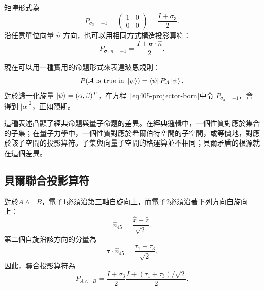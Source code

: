 矩陣形式為
\begin{equation}
  P_{\sigma_3=+1}
  =
  \begin{pmatrix}1&0\\0&0\end{pmatrix}
  =
  \frac{I+\sigma_3}{2}.
  \label{eq:l05-p3}
\end{equation}
沿任意單位向量 \(\hat n\) 方向，也可以用相同方式構造投影算符：
\begin{equation}
  P_{\boldsymbol{\sigma}\cdot\hat n=+1}
  =
  \frac{I+\boldsymbol{\sigma}\cdot\hat n}{2}.
  \label{eq:l05-pn}
\end{equation}

\begin{classroomqa}
\end{classroomqa}

現在可以用一種實用的命題形式來表達玻恩規則：
\begin{equation}
  P(\mathcal A\text{ is true in }\left\lvert\psi\right\rangle)
  =
  \left\langle\psi\right\rvert P_{\mathcal A}\left\lvert\psi\right\rangle.
  \label{eq:l05-projector-born}
\end{equation}
對於歸一化旋量 \(\left\lvert\psi\right\rangle=(\alpha,\beta)^T\)，在方程~\eqref{eq:l05-projector-born}中令 \(P_{\sigma_3=+1}\)，會得到 \(|\alpha|^2\)，正如預期。

這種表述凸顯了經典命題與量子命題的差異。在經典邏輯中，一個性質對應於集合的子集；在量子力學中，一個性質對應於希爾伯特空間的子空間，或等價地，對應於該子空間的投影算符。子集與向量子空間的格運算並不相同；貝爾矛盾的根源就在這個差異。

\subsection{貝爾聯合投影算符}

對於\(A\wedge\neg B\)，電子1必須沿第三軸自旋向上，而電子2必須沿著下列方向自旋向上：
\begin{equation}
  \hat n_{45}=\frac{\hat x+\hat z}{\sqrt2}.
\end{equation}
第二個自旋沿該方向的分量為
\begin{equation}
  \boldsymbol{\tau}\cdot\hat n_{45}
  =
  \frac{\tau_1+\tau_3}{\sqrt2}.
\end{equation}
因此，聯合投影算符為
\begin{equation}
  P_{A\wedge\neg B}
  =
  \frac{I+\sigma_3}{2}
  \frac{I+(\tau_1+\tau_3)/\sqrt2}{2}.
  \label{eq:l05-joint-projector}
\end{equation}

